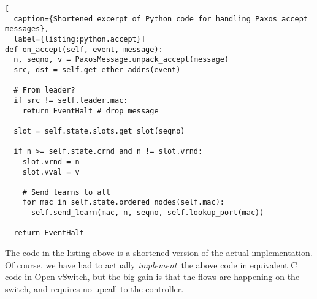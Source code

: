 \begin{lstlisting}[
  caption={Shortened excerpt of Python code for handling Paxos accept messages},
  label={listing:python.accept}]
def on_accept(self, event, message):
  n, seqno, v = PaxosMessage.unpack_accept(message)
  src, dst = self.get_ether_addrs(event)

  # From leader?
  if src != self.leader.mac:
    return EventHalt # drop message

  slot = self.state.slots.get_slot(seqno)

  if n >= self.state.crnd and n != slot.vrnd:
    slot.vrnd = n
    slot.vval = v

    # Send learns to all
    for mac in self.state.ordered_nodes(self.mac):
      self.send_learn(mac, n, seqno, self.lookup_port(mac))

  return EventHalt
\end{lstlisting}

The code in the listing above is a shortened version of the
actual implementation.
%
Of course, we have had to actually \textit{implement} the above code in
equivalent C code in Open vSwitch, but the big gain is that the flows are
happening on the switch, and requires no upcall to the controller.
